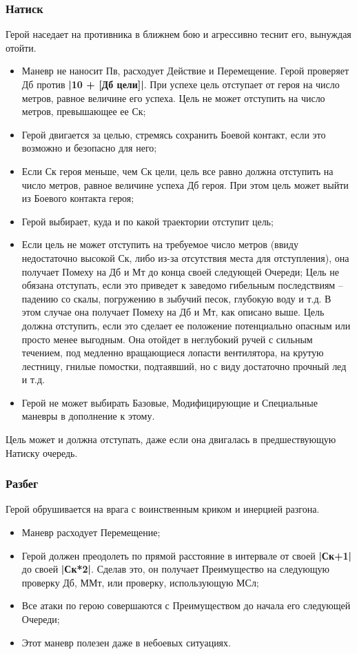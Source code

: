 \subsubsection{Натиск}
Герой наседает на противника в ближнем бою и агрессивно теснит его, вынуждая отойти.
\begin{itemize}
  \item Маневр не наносит Пв, расходует Действие и Перемещение. Герой проверяет Дб против \textbf{|10 + [Дб цели]|}. При успехе цель отступает от героя на число метров, равное величине его успеха. Цель не может отступить на число метров, превышающее ее Ск;
  \item Герой двигается за целью, стремясь сохранить Боевой контакт, если это возможно и безопасно для него;
  \item Если Ск героя меньше, чем Ск цели, цель все равно должна отступить на число метров, равное величине успеха Дб героя. При этом цель может выйти из Боевого контакта героя;
  \item Герой выбирает, куда и по какой траектории отступит цель;
  \item Если цель не может отступить на требуемое число метров (ввиду недостаточно высокой Ск, либо из-за отсутствия места для отступления), она получает Помеху на Дб и Мт до конца своей следующей Очереди;
    \newline Цель не обязана отступать, если это приведет к заведомо гибельным последствиям – падению со скалы, погружению в зыбучий песок, глубокую воду и т.д. В этом случае она получает Помеху на Дб и Мт, как описано выше. Цель должна отступить, если это сделает ее положение потенциально опасным или просто менее выгодным. Она отойдет в неглубокий ручей с сильным течением, под медленно вращающиеся лопасти вентилятора, на крутую лестницу, гнилые помостки, подтаявший, но с виду достаточно прочный лед и т.д.
  \item Герой не может выбирать Базовые, Модифицирующие и Специальные  маневры в дополнение к этому.
\end{itemize}
\begin{tcolorbox}
  Цель может и должна отступать, даже если она двигалась в предшествующую Натиску очередь. 
\end{tcolorbox}

\subsubsection{Разбег}
Герой обрушивается на врага с воинственным криком и инерцией разгона.

\begin{itemize}
  \item Маневр расходует Перемещение;
  \item Герой должен преодолеть по прямой расстояние в интервале от своей \textbf{|Ск+1|} до своей \textbf{|Ск*2|}. Сделав это, он получает Преимущество на следующую проверку Дб, ММт, или проверку, использующую МСл;
  \item Все атаки по герою совершаются с Преимуществом до начала его следующей Очереди;
  \item Этот маневр полезен даже в небоевых ситуациях.
\end{itemize}
